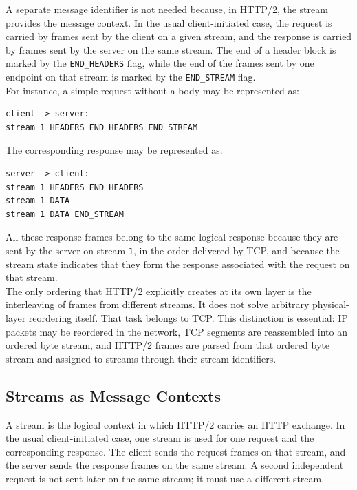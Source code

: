 \documentclass{scrbook}
\begin{document}
A separate message identifier is not needed because, in HTTP/2, the stream provides the message context. In the usual client-initiated case, the request is carried by frames sent by the client on a given stream, and the response is carried by frames sent by the server on the same stream. The end of a header block is marked by the \texttt{END\_HEADERS} flag, while the end of the frames sent by one endpoint on that stream is marked by the \texttt{END\_STREAM} flag.\\

For instance, a simple request without a body may be represented as:

\begin{lstlisting}
client -> server:
stream 1 HEADERS END_HEADERS END_STREAM
\end{lstlisting}

The corresponding response may be represented as:

\begin{lstlisting}
server -> client:
stream 1 HEADERS END_HEADERS
stream 1 DATA
stream 1 DATA END_STREAM
\end{lstlisting}

All these response frames belong to the same logical response because they are sent by the server on stream \texttt{1}, in the order delivered by TCP, and because the stream state indicates that they form the response associated with the request on that stream.\\

The only ordering that HTTP/2 explicitly creates at its own layer is the interleaving of frames from different streams. It does not solve arbitrary physical-layer reordering itself. That task belongs to TCP. This distinction is essential: IP packets may be reordered in the network, TCP segments are reassembled into an ordered byte stream, and HTTP/2 frames are parsed from that ordered byte stream and assigned to streams through their stream identifiers.

\subsection{Streams as Message Contexts}

A stream is the logical context in which HTTP/2 carries an HTTP exchange. In the usual client-initiated case, one stream is used for one request and the corresponding response. The client sends the request frames on that stream, and the server sends the response frames on the same stream. A second independent request is not sent later on the same stream; it must use a different stream.\\
\end{document}
